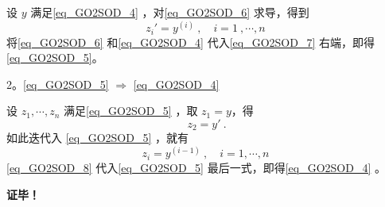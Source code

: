 设 $y$ 满足\autoref{eq_GO2SOD_4} ，对\autoref{eq_GO2SOD_6} 求导，得到
\begin{equation}\label{eq_GO2SOD_7}
z_i'=y^{(i)}~,\quad i=1~,\cdots,n~
\end{equation}
将\autoref{eq_GO2SOD_6} 和\autoref{eq_GO2SOD_4} 代入\autoref{eq_GO2SOD_7} 右端，即得\autoref{eq_GO2SOD_5}。

2。\autoref{eq_GO2SOD_5} $\Rightarrow$ \autoref{eq_GO2SOD_4} 

设 $z_1,\cdots,z_n$ 满足\autoref{eq_GO2SOD_5} ，取 $z_1=y$，得
\begin{equation}
z_2=y'~.
\end{equation}
如此迭代入 \autoref{eq_GO2SOD_5} ，就有
\begin{equation}\label{eq_GO2SOD_8}
z_i=y^{(i-1)}~,\quad i=1,\cdots,n~
\end{equation}
\autoref{eq_GO2SOD_8} 代入\autoref{eq_GO2SOD_5} 最后一式，即得\autoref{eq_GO2SOD_4} 。

\textbf{证毕！}

